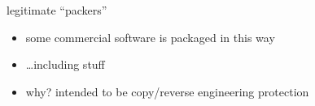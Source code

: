 
\begin{frame}{legitimate ``packers''}
    \begin{itemize}
    \item some commercial software is packaged in this way
    \item \ldots including  stuff
    \vspace{.5cm}
    \item why? intended to be copy/reverse engineering protection
    \end{itemize}
\end{frame}

